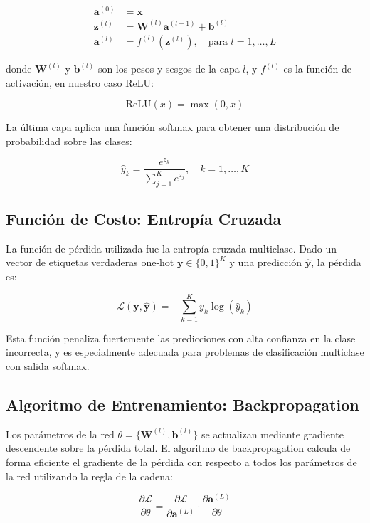 \documentclass[11pt]{article}
\begin{document}
\[
\begin{aligned}
\mathbf{a}^{(0)} &= \mathbf{x} \\
\mathbf{z}^{(l)} &= \mathbf{W}^{(l)} \mathbf{a}^{(l-1)} + \mathbf{b}^{(l)} \\
\mathbf{a}^{(l)} &= f^{(l)}(\mathbf{z}^{(l)}), \quad \text{para } l = 1, \dots, L
\end{aligned}
\]

donde \( \mathbf{W}^{(l)} \) y \( \mathbf{b}^{(l)} \) son los pesos y sesgos de la capa \( l \), y \( f^{(l)} \) es la función de activación, en nuestro caso ReLU:

\[
\text{ReLU}(x) = \max(0, x)
\]

La última capa aplica una función softmax para obtener una distribución de probabilidad sobre las clases:

\[
\hat{y}_k = \frac{e^{z_k}}{\sum_{j=1}^{K} e^{z_j}}, \quad k = 1, \dots, K
\]

\subsection*{Función de Costo: Entropía Cruzada}

La función de pérdida utilizada fue la entropía cruzada multiclase. Dado un vector de etiquetas verdaderas one-hot \( \mathbf{y} \in \{0,1\}^K \) y una predicción \( \hat{\mathbf{y}} \), la pérdida es:

\[
\mathcal{L}(\mathbf{y}, \hat{\mathbf{y}}) = - \sum_{k=1}^{K} y_k \log(\hat{y}_k)
\]

Esta función penaliza fuertemente las predicciones con alta confianza en la clase incorrecta, y es especialmente adecuada para problemas de clasificación multiclase con salida softmax.

\subsection*{Algoritmo de Entrenamiento: Backpropagation}

Los parámetros de la red \( \theta = \{ \mathbf{W}^{(l)}, \mathbf{b}^{(l)} \} \) se actualizan mediante gradiente descendente sobre la pérdida total. El algoritmo de backpropagation calcula de forma eficiente el gradiente de la pérdida con respecto a todos los parámetros de la red utilizando la regla de la cadena:

\[
\frac{\partial \mathcal{L}}{\partial \theta} = \frac{\partial \mathcal{L}}{\partial \mathbf{a}^{(L)}} \cdot \frac{\partial \mathbf{a}^{(L)}}{\partial \theta}
\]
\end{document}
